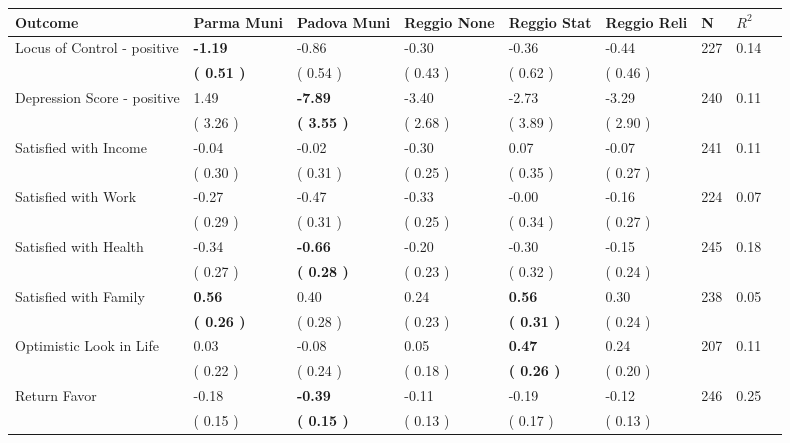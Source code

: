 \begin{tabular}{L{6.2cm} C{1.8cm} C{1.8cm} C{1.8cm} C{1.8cm} C{1.8cm} C{1.8cm} C{0.3cm} C{0.3cm}}
\toprule
 \textbf{Outcome} & \textbf{Parma Muni} & \textbf{Padova Muni} & \textbf{Reggio None} & \textbf{Reggio Stat} & \textbf{Reggio Reli} & \textbf{N} & \textbf{$ R^2$} \\
\midrule
Locus of Control - positive & \textbf{    -1.19} &     -0.86 &     -0.30 &     -0.36 &     -0.44  & 227 &       0.14 \\ 
 & \textbf{(     0.51 )} & (     0.54 ) & (     0.43 ) & (     0.62 ) & (     0.46 )  & \\
Depression Score - positive &      1.49 & \textbf{    -7.89} &     -3.40 &     -2.73 &     -3.29  & 240 &       0.11 \\ 
 & (     3.26 ) & \textbf{(     3.55 )} & (     2.68 ) & (     3.89 ) & (     2.90 )  & \\
Satisfied with Income &     -0.04 &     -0.02 &     -0.30 &      0.07 &     -0.07  & 241 &       0.11 \\ 
 & (     0.30 ) & (     0.31 ) & (     0.25 ) & (     0.35 ) & (     0.27 )  & \\
Satisfied with Work &     -0.27 &     -0.47 &     -0.33 &     -0.00 &     -0.16  & 224 &       0.07 \\ 
 & (     0.29 ) & (     0.31 ) & (     0.25 ) & (     0.34 ) & (     0.27 )  & \\
Satisfied with Health &     -0.34 & \textbf{    -0.66} &     -0.20 &     -0.30 &     -0.15  & 245 &       0.18 \\ 
 & (     0.27 ) & \textbf{(     0.28 )} & (     0.23 ) & (     0.32 ) & (     0.24 )  & \\
Satisfied with Family & \textbf{     0.56} &      0.40 &      0.24 & \textbf{     0.56} &      0.30  & 238 &       0.05 \\ 
 & \textbf{(     0.26 )} & (     0.28 ) & (     0.23 ) & \textbf{(     0.31 )} & (     0.24 )  & \\
Optimistic Look in Life &      0.03 &     -0.08 &      0.05 & \textbf{     0.47} &      0.24  & 207 &       0.11 \\ 
 & (     0.22 ) & (     0.24 ) & (     0.18 ) & \textbf{(     0.26 )} & (     0.20 )  & \\
Return Favor &     -0.18 & \textbf{    -0.39} &     -0.11 &     -0.19 &     -0.12  & 246 &       0.25 \\ 
 & (     0.15 ) & \textbf{(     0.15 )} & (     0.13 ) & (     0.17 ) & (     0.13 )  & \\

\end{tabular}
